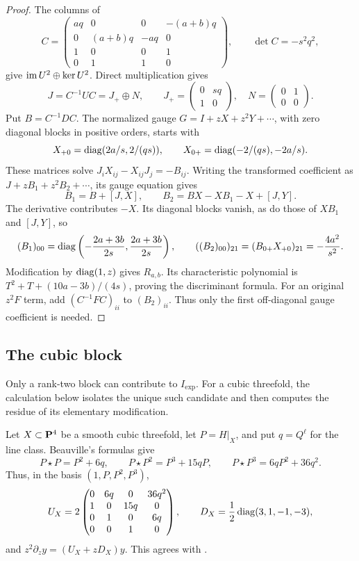 \begin{proof}
The columns of
\[
 C=\begin{pmatrix}
 aq&0&0&-(a+b)q\\
 0&(a+b)q&-aq&0\\
 1&0&0&1\\0&1&1&0
 \end{pmatrix},\qquad \det C=-s^2q^2,
\]
give \(\operatorname{im} U^2\oplus\ker U^2\).  Direct multiplication gives
\[
 J=C^{-1}UC=J_+\oplus N,\qquad
 J_+=\begin{pmatrix}0&sq\\1&0\end{pmatrix},\quad
 N=\begin{pmatrix}0&1\\0&0\end{pmatrix}.
\]
Put \(B=C^{-1}DC\).  The normalized gauge \(G=I+zX+z^2Y+\cdots\),
with zero diagonal blocks in positive orders, starts with
\[
 X_{+0}=\operatorname{diag}(2a/s,2/(qs)),\qquad
 X_{0+}=\operatorname{diag}(-2/(qs),-2a/s).
\]
These matrices solve \(J_iX_{ij}-X_{ij}J_j=-B_{ij}\).
Writing the transformed coefficient as \(J+zB_1+z^2B_2+\cdots\), its
gauge equation gives
\[
 B_1=B+[J,X],\qquad B_2=BX-XB_1-X+[J,Y].
\]
The derivative contributes \(-X\).  Its diagonal blocks vanish, as do
those of \(XB_1\) and \([J,Y]\), so
\[
 (B_1)_{00}=\operatorname{diag}\left(-\frac{2a+3b}{2s},\frac{2a+3b}{2s}\right),
 \qquad ((B_2)_{00})_{21}=(B_{0+}X_{+0})_{21}
 =-\frac{4a^2}{s^2}.
\]
Modification by \(\operatorname{diag}(1,z)\) gives \(R_{a,b}\).  Its characteristic
polynomial is \(T^2+T+(10a-3b)/(4s)\), proving the discriminant formula.
For an original \(z^2F\) term, add \((C^{-1}FC)_{ii}\) to \((B_2)_{ii}\).
Thus only the first off-diagonal gauge coefficient is needed.
\end{proof}

\subsection{The cubic block}
\label{subsec:shared-cubic-packet}

Only a rank-two block can contribute to \(I_{\mathrm{exp}}\).  For a cubic
threefold, the calculation below isolates the unique such candidate and then
computes the residue of its elementary modification.

Let \(X\subset\mathbf P^4\) be a smooth cubic threefold, let \(P=H|_X\), and put
\(q=Q^\ell\) for the line class.  Beauville's formulas
give \cite[main theorem and (2.1)--(2.3)]{Beauville}
\begin{equation}
 P\star P=P^2+6q,\qquad
 P\star P^2=P^3+15qP,\qquad
 P\star P^3=6qP^2+36q^2.
 \label{eq:beauville-cubic-products}
\end{equation}
Thus, in the basis \((1,P,P^2,P^3)\),
\begin{equation}
 U_X=2\begin{pmatrix}
 0&6q&0&36q^2\\1&0&15q&0\\0&1&0&6q\\0&0&1&0
 \end{pmatrix},
 \qquad D_X=\frac12\operatorname{diag}(3,1,-1,-3),
 \label{eq:cubic-small-even-connection}
\end{equation}
and \(z^2\partial_zy=(U_X+zD_X)y\).  This agrees with
\cite[Section~3]{Cai}.


